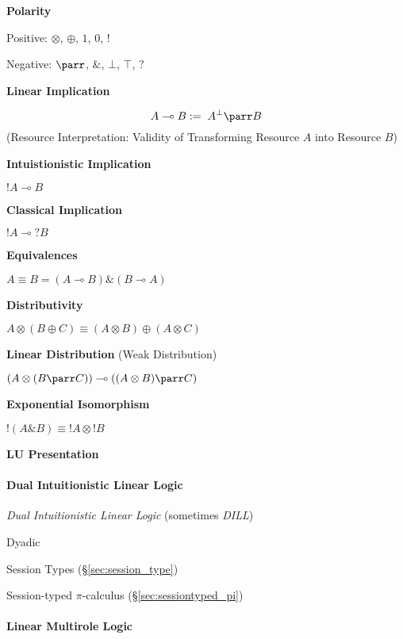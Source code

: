 \textbf{Polarity}

Positive: $\otimes$, $\oplus$, $1$, $0$, $!$

Negative: $\parr$, $\&$, $\bot$, $\top$, $?$


\textbf{Linear Implication}

\[
  A \multimap B := \; A^{\bot} \parr B
\]
(Resource Interpretation: Validity of Transforming Resource $A$ into
Resource $B$)


\textbf{Intuistionistic Implication}

$!A \multimap B$


\textbf{Classical Implication}

$!A \multimap ?B$


\textbf{Equivalences}

$A \equiv B = (A \multimap B) \& (B \multimap A)$


\textbf{Distributivity}

$A \otimes (B \oplus C) \equiv (A \otimes B) \oplus (A \otimes C)$


\textbf{Linear Distribution} (Weak Distribution)

$(A \otimes (B \parr C)) \multimap ((A \otimes B) \parr C)$


\textbf{Exponential Isomorphism}

$!(A \& B) \equiv !A \otimes !B$


\textbf{LU Presentation}



\paragraph{Dual Intuitionistic Linear Logic}\hfill
\label{sec:dual_linear_logic}

\cite{andreoli92}

\emph{Dual Intuitionistic Linear Logic} (sometimes \emph{DILL})

Dyadic

Session Types (\S\ref{sec:session_type})

Session-typed $\pi$-calculus (\S\ref{sec:sessiontyped_pi})



\paragraph{Linear Multirole Logic}\label{sec:lmrl}\hfill

\begingroup

\newcommand{\msg}{\mathtt{msg}}
\newcommand{\nil}{\mathtt{nil}}

